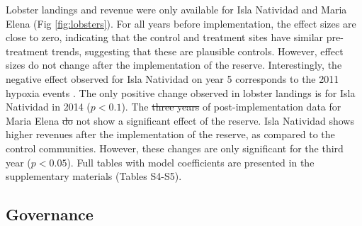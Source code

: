 \documentclass{frontiersSCNS}
\providecommand{\DIFaddtex}[1]{{\protect\color{blue}\uwave{#1}}} %
\providecommand{\DIFdeltex}[1]{{\protect\color{red}\sout{#1}}}                      %
\providecommand{\DIFaddbegin}{} %
\providecommand{\DIFaddend}{} %
\providecommand{\DIFdelbegin}{} %
\providecommand{\DIFdelend}{} %
\providecommand{\DIFadd}[1]{\texorpdfstring{\DIFaddtex{#1}}{#1}} %
\providecommand{\DIFdel}[1]{\texorpdfstring{\DIFdeltex{#1}}{}} %
\begin{document}
Lobster landings and revenue were only available for Isla Natividad and Maria Elena (Fig \ref{fig:lobsters}). For all years before implementation, the effect sizes are close to zero, indicating that the control and treatment sites have similar pre-treatment trends, suggesting that these are plausible controls. However, effect sizes do not change after the implementation of the reserve. Interestingly, the negative effect observed for Isla Natividad on year 5 corresponds to the 2011 hypoxia events \citep{micheli_2012-EU}. The only positive change observed in lobster landings is for Isla Natividad in 2014 (\(p < 0.1\)). The \DIFdelbegin \DIFdel{three years }\DIFdelend \DIFaddbegin \DIFadd{year }\DIFaddend of post-implementation data for Maria Elena \DIFdelbegin \DIFdel{do }\DIFdelend \DIFaddbegin \DIFadd{does }\DIFaddend not show a significant effect of the reserve. Isla Natividad shows higher revenues after the implementation of the reserve, as compared to the control communities. However, these changes are only significant for the third year (\(p < 0.05\)). Full tables with model coefficients are presented in the supplementary materials (Tables S4-S5).

\hypertarget{governance}{%
\subsection{Governance}\label{governance}}
\end{document}
